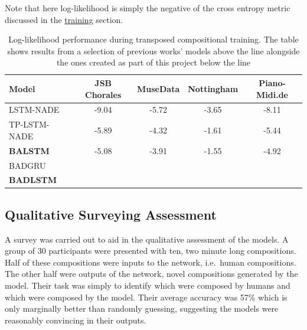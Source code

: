 \documentclass[12pt,]{article}
\begin{document}
Note that here log-likelihood is simply the negative of the cross
entropy metric discussed in the \protect\hyperlink{training}{training}
section.

\begin{table}[H]
\centering
\caption{Log-likelihood performance during transposed compositional training. The table shows results from a selection of previous works’ models above the line alongside the ones created as part of this project below the line}
\vspace{1em}
\begin{tabular}{lcccc} 
\toprule
\textbf{Model}    & \textbf{JSB Chorales} & \textbf{MuseData} & \textbf{Nottingham} & \textbf{Piano-Midi.de}  \\ 
\midrule
LSTM-NADE         & -9.04                 & -5.72             & -3.65               & -8.11                   \\
TP-LSTM-NADE      & -5.89                 & -4.32             & -1.61               & -5.44                   \\
\textbf{BALSTM}   & -5.08                 & -3.91             & -1.55               & -4.92                   \\
\midrule
BADGRU            &                       &                   &                     &                         \\
\textbf{BADLSTM}  &                       &                   &                     &                         \\
\bottomrule
\end{tabular}
\end{table}

\hypertarget{qualitative-surveying-assessment}{%
\subsection{Qualitative Surveying
Assessment}\label{qualitative-surveying-assessment}}

A survey was carried out to aid in the qualitative assessment of the
models. A group of 30 participants were presented with ten, two minute
long compositions. Half of these compositions were inputs to the
network, i.e.~human compositions. The other half were outputs of the
network, novel compositions generated by the model. Their task was
simply to identify which were composed by humans and which were composed
by the model. Their average accuracy was 57\% which is only marginally
better than randomly guessing, suggesting the models were reasonably
convincing in their outputs.
\end{document}
